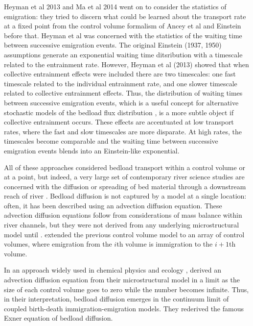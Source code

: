 Heyman et al 2013 and Ma et al 2014 went on to consider the statistics of emigration: they tried to discern what could be learned about the transport rate at a fixed point from the control volume formalism of Ancey et al and Einstein before that. 
Heyman et al was concerned with the statistics of the waiting time between successive emigration events. 
The original Einstein (1937, 1950) assumptions generate an exponential waiting time ditsribution with a timescale related to the entrainment rate.  
However, Heyman et al (2013) showed that when collective entrainment effects were included there are two timescales: one fast timescale related to the individual entrainment rate, and one slower timescale related to collective entrainment effects. 
Thus, the distribution of waiting times between successive emigration events, which is a useful concept for alternative stochastic models of the bedload flux distribution \citep[e.g.][]{Turowski2010}, is a more subtle object if collective entrainment occurs. 
These effects are accentuated at low transport rates, where the fast and slow timescales are more disparate. 
At high rates, the timescales become comparable and the waiting time between successive emigration events blends into an Einstein-like exponential. 

All of these approaches considered bedload transport within a control volume or at a point, but indeed, a very large set of contemporary river science studies are concerned with the diffusion or spreading of bed material through a downstream reach of river \citep{Hassan2016}. 
Bedload diffusion is not captured by a model at a single location: often, it has been described using an advection diffusion equation. 
These advection diffusion equations follow from considerations of mass balance within river channels, but they were not derived from any underlying microstructural model until \citep{Ancey2014}. 
\citet{Ancey2014} extended the previous control volume model \citep{Ancey2008} to an array of control volumes, where emigration from the $i$th volume is immigration to the $i+1$th volume. 

In an approach widely used in chemical physics \citep{Gardiner1983} and ecology \citep{Bailey1968}, \citet{Ancey2015, Ancey2015} derived an advection diffusion equation from their microstructural model in a limit as the size of each control volume goes to zero while the number becomes infinite. 
Thus, in their interpretation, bedload diffusion emerges in the continuum limit of coupled birth-death immigration-emigration models. 
They rederived the famous Exner equation of bedload diffusion. 

